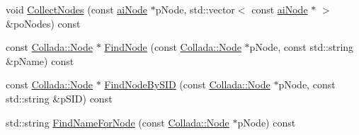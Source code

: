 \begin{DoxyCompactItemize}
\item 
void \hyperlink{class_assimp_1_1_collada_loader_a82e37e098f72c7aad05d29b160d2c8a8}{Collect\+Nodes} (const \hyperlink{structai_node}{ai\+Node} $\ast$p\+Node, std\+::vector$<$ const \hyperlink{structai_node}{ai\+Node} $\ast$ $>$ \&po\+Nodes) const 
\item 
const \hyperlink{struct_assimp_1_1_collada_1_1_node}{Collada\+::\+Node} $\ast$ \hyperlink{class_assimp_1_1_collada_loader_ad93b29540018b969580dce787f116121}{Find\+Node} (const \hyperlink{struct_assimp_1_1_collada_1_1_node}{Collada\+::\+Node} $\ast$p\+Node, const std\+::string \&p\+Name) const 
\item 
const \hyperlink{struct_assimp_1_1_collada_1_1_node}{Collada\+::\+Node} $\ast$ \hyperlink{class_assimp_1_1_collada_loader_a6448ad9e38c338838e8c39e18e473db8}{Find\+Node\+By\+S\+I\+D} (const \hyperlink{struct_assimp_1_1_collada_1_1_node}{Collada\+::\+Node} $\ast$p\+Node, const std\+::string \&p\+S\+I\+D) const 
\item 
std\+::string \hyperlink{class_assimp_1_1_collada_loader_aea13d0332577518ef410fe3ad8bc822e}{Find\+Name\+For\+Node} (const \hyperlink{struct_assimp_1_1_collada_1_1_node}{Collada\+::\+Node} $\ast$p\+Node) const 
\end{DoxyCompactItemize}
